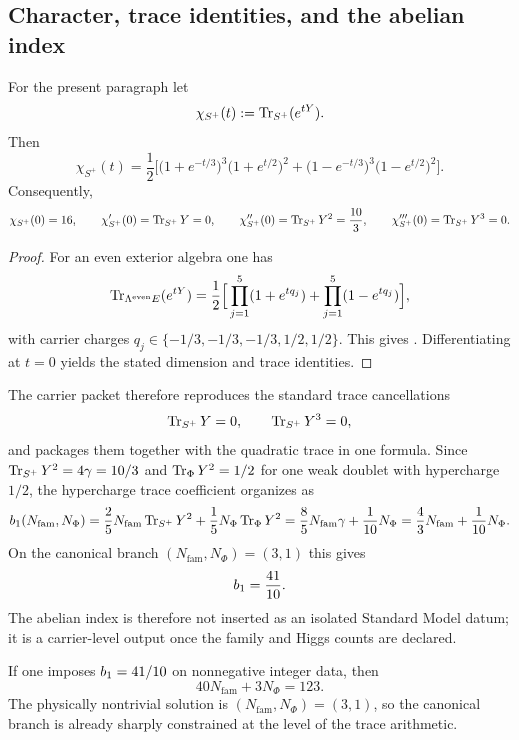 \subsection{Character, trace identities, and the abelian index}

\begin{proposition}
For the present paragraph let
\[
\chi_{S^+}(t):=\operatorname{Tr}_{S^+}(e^{tY}).
\]
Then
\begin{equation}
\label{eq:family-character}
\chi_{S^+}(t)
=
\frac12\Big[
\bigl(1+e^{-t/3}\bigr)^3\bigl(1+e^{t/2}\bigr)^2
+
\bigl(1-e^{-t/3}\bigr)^3\bigl(1-e^{t/2}\bigr)^2
\Big].
\end{equation}
Consequently,
\[
\chi_{S^+}(0)=16,
\qquad
\chi_{S^+}'(0)=\operatorname{Tr}_{S^+}Y=0,
\qquad
\chi_{S^+}''(0)=\operatorname{Tr}_{S^+}Y^2=\frac{10}{3},
\qquad
\chi_{S^+}'''(0)=\operatorname{Tr}_{S^+}Y^3=0.
\]
\end{proposition}

\begin{proof}
For an even exterior algebra one has
\[
\operatorname{Tr}_{\Lambda^{\mathrm{even}}E}(e^{tY})
=
\frac12\Big[\prod_{j=1}^5(1+e^{tq_j})+\prod_{j=1}^5(1-e^{tq_j})\Big],
\]
with carrier charges $q_j\in\{-1/3,-1/3,-1/3,1/2,1/2\}$. This gives . Differentiating at $t=0$ yields the stated dimension and trace identities.
\end{proof}

The carrier packet therefore reproduces the standard trace cancellations
\[
\operatorname{Tr}_{S^+}Y=0,
\qquad
\operatorname{Tr}_{S^+}Y^3=0,
\]
and packages them together with the quadratic trace in one formula. Since $\operatorname{Tr}_{S^+}Y^2=4\gamma=10/3$ and $\operatorname{Tr}_\Phi Y^2=1/2$ for one weak doublet with hypercharge $1/2$, the hypercharge trace coefficient organizes as
\begin{equation}
\label{eq:abelian-index}
b_1(N_{\mathrm{fam}},N_\Phi)
=
\frac25N_{\mathrm{fam}}\operatorname{Tr}_{S^+}Y^2+\frac15N_\Phi\operatorname{Tr}_\Phi Y^2
=
\frac85N_{\mathrm{fam}}\gamma+\frac1{10}N_\Phi
=
\frac43N_{\mathrm{fam}}+\frac1{10}N_\Phi.
\end{equation}
On the canonical branch $(N_{\mathrm{fam}},N_\Phi)=(3,1)$ this gives
\[
b_1=\frac{41}{10}.
\]
The abelian index is therefore not inserted as an isolated Standard Model datum; it is a carrier-level output once the family and Higgs counts are declared.

\begin{remark}
If one imposes $b_1=41/10$ on nonnegative integer data, then
\[
40N_{\mathrm{fam}}+3N_\Phi=123.
\]
The physically nontrivial solution is $(N_{\mathrm{fam}},N_\Phi)=(3,1)$, so the canonical branch is already sharply constrained at the level of the trace arithmetic.
\end{remark}

